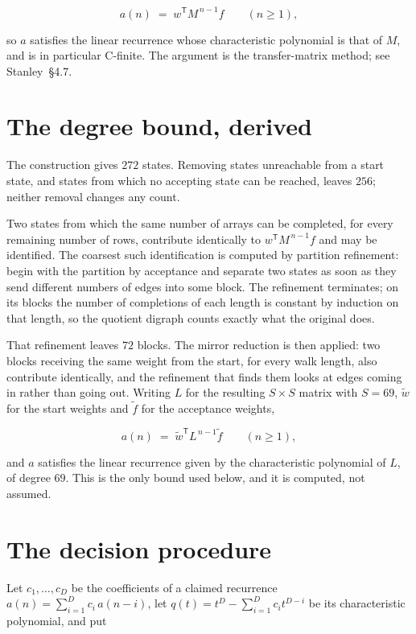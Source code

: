 \documentclass[11pt]{article}
\theoremstyle{definition}
\begin{document}
\[a(n) \;=\; w^{\mathsf T} M^{\,n-1} f \qquad (n \ge 1),\]

so $a$ satisfies the linear recurrence whose characteristic polynomial is that of $M$, and is in particular C-finite. The argument is the transfer-matrix method; see Stanley~\S4.7.

\section{The degree bound, derived}

The construction gives $272$ states. Removing states unreachable from a start state, and states from which no accepting state can be reached, leaves $256$; neither removal changes any count.

Two states from which the same number of arrays can be completed, for every remaining number of rows, contribute identically to $w^{\mathsf T}M^{\,n-1}f$ and may be identified. The coarsest such identification is computed by partition refinement: begin with the partition by acceptance and separate two states as soon as they send different numbers of edges into some block. The refinement terminates; on its blocks the number of completions of each length is constant by induction on that length, so the quotient digraph counts exactly what the original does.

That refinement leaves $72$ blocks. The mirror reduction is then applied: two blocks receiving the same weight from the start, for every walk length, also contribute identically, and the refinement that finds them looks at edges coming in rather than going out. Writing $L$ for the resulting $S \times S$ matrix with $S = 69$, $\tilde w$ for the start weights and $\tilde f$ for the acceptance weights,

\[a(n) \;=\; \tilde w^{\mathsf T} L^{\,n-1} \tilde f \qquad (n \ge 1),\]

and $a$ satisfies the linear recurrence given by the characteristic polynomial of $L$, of degree $69$. This is the only bound used below, and it is computed, not assumed.

\section{The decision procedure}

Let $c_1,\dots,c_D$ be the coefficients of a claimed recurrence $a(n) = \sum_{i=1}^{D} c_i\,a(n-i)$, let $q(t) = t^{D} - \sum_{i=1}^{D} c_i t^{D-i}$ be its characteristic polynomial, and put
\end{document}
